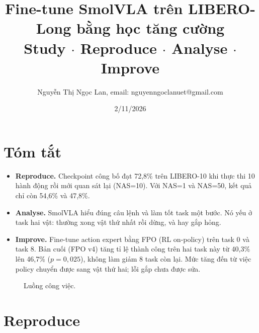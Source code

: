 \documentclass[10pt,a4paper]{article}
\title{\textbf{Fine-tune SmolVLA trên LIBERO-Long bằng học tăng cường}\\[2pt]
\large Study $\cdot$ Reproduce $\cdot$ Analyse $\cdot$ Improve}
\author{Nguyễn Thị Ngọc Lan, email: nguyenngoclanuet@gmail.com}
\date{2/11/2026}
\newcommand{\code}[1]{\texttt{\detokenize{#1}}}
\begin{document}
\maketitle
\vspace{-1.2em}

\section*{Tóm tắt}
\begin{itemize}
\item \textbf{Reproduce.} Checkpoint công bố \code{lerobot/smolvla_libero} đạt 72{,}8\% trên LIBERO-10 khi thực thi 10 hành
động rồi mới quan sát lại (NAS=10). Với NAS=1 và NAS=50, kết quả chỉ còn 54{,}6\% và 47{,}8\%.
\item \textbf{Analyse.} SmolVLA hiểu đúng câu lệnh và làm tốt task một bước. Nó yếu ở task hai vật: thường xong vật thứ
nhất rồi dừng, và hay gắp hỏng.
\item \textbf{Improve.} Fine-tune action expert bằng FPO (RL on-policy) trên task 0 và task 8. Bản cuối (FPO v4) tăng tỉ lệ
thành công trên hai task này từ 40{,}3\% lên 46{,}7\% ($p=0{,}025$), không làm giảm 8 task còn lại. Mức tăng đến từ việc
policy chuyển được sang vật thứ hai; lỗi gắp chưa được sửa.
\end{itemize}

\begin{figure}[H]
\centering
{}
\caption{Luồng công việc.}
\label{fig:flow}
\end{figure}

\section{Reproduce}
\end{document}
